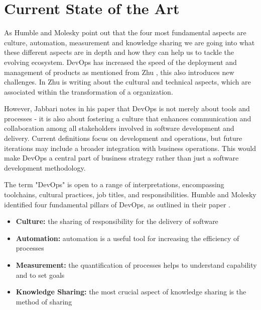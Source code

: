 
\chapter{Current State of the Art}

\label{Chapter2} %

As Humble and Molesky \cite{HumbleMolesky2011} point out that the four most fundamental aspects are culture, automation, measurement and knowledge sharing we are going into what these different aspects are in depth and how they can help us to tackle the evolving ecosystem. \ac{DevOps} has increased the speed of the deployment and management of products as mentioned from Zhu \cite{Zhu2016DevOps}, this also introduces new challenges. In \cite{Zhu2016DevOps} Zhu is writing about the cultural and technical aspects, which are associated within the transformation of a organization.

However, Jabbari \cite{Jabbari2016} notes in his paper that \ac{DevOps} is not merely about tools and processes - it is also about fostering a culture that enhances communication and collaboration among all stakeholders involved in software development and delivery. Current definitions focus on development and operations, but future iterations may include a broader integration with business operations. This would make \ac{DevOps} a central part of business strategy rather than just a software development methodology.

The term "\ac{DevOps}" is open to a range of interpretations, encompassing toolchains, cultural practices, job titles, and responsibilities. Humble and Molesky identified four fundamental pillars of \ac{DevOps}, as outlined in their paper \cite{HumbleMolesky2011}.

\begin{itemize}
    \item \textbf{Culture:} the sharing of responsibility for the delivery of software
    \item \textbf{Automation:} automation is a useful tool for increasing the efficiency of processes
    \item \textbf{Measurement:} the quantification of processes helps to understand capability and to set goals
    \item \textbf{Knowledge Sharing:} the most crucial aspect of knowledge sharing is the method of sharing
\end{itemize}


